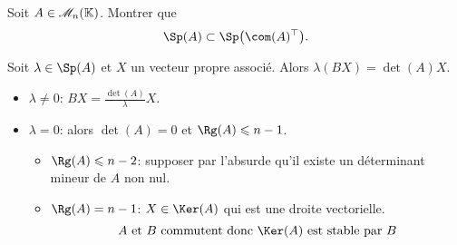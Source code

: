\begin{exercice}
    Soit $A \in \mathscr{M}_n(\mathbb{K})$. Montrer que 
    $$\Sp(A) \subset \Sp \big( \Trsp{\com(A)} \big).$$
\end{exercice}
\begin{elemsolution}
    Soit $\lambda \in \Sp(A)$ et $X$ un vecteur propre associé. Alors $\lambda (BX) = \det(A) X$. 
        
    \begin{itemize}
        \item $\lambda \not = 0$: $BX = \frac{\det(A)}{\lambda}X$. 
        \item $\lambda = 0$: alors $\det(A) = 0$ et $\Rg(A) \leqslant n-1$. 
        \begin{itemize}
            \item $\Rg(A) \leqslant n-2$: supposer par l'absurde qu'il existe un déterminant mineur de $A$ non nul. 
            \item $\Rg(A) = n-1$: $X \in \Ker(A)$ qui est une droite vectorielle. 
            $$A \text{ et } B \text{ commutent donc } \Ker(A) \text{ est stable par } B$$
        \end{itemize}
    \end{itemize}
\end{elemsolution}
